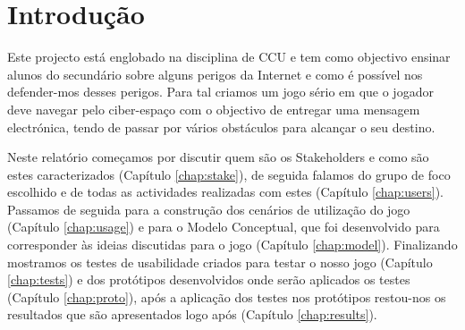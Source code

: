 \chapter{Introdução}
\label{chap:intro} 

Este projecto está englobado na disciplina de \ac{CCU} e tem como objectivo ensinar alunos do secundário sobre alguns perigos da Internet e como é possível nos defender-mos desses perigos.
Para tal criamos um jogo sério em que o jogador deve navegar pelo ciber-espaço com o objectivo de entregar uma mensagem electrónica, tendo de passar por vários obstáculos para alcançar o seu destino.

Neste relatório começamos por discutir quem são os Stakeholders e como são estes caracterizados (Capítulo \ref{chap:stake}), de seguida falamos do grupo de foco escolhido e de todas as actividades realizadas com estes (Capítulo \ref{chap:users}).
Passamos de seguida para a construção dos cenários de utilização do jogo (Capítulo \ref{chap:usage}) e para o Modelo Conceptual, que foi desenvolvido para corresponder às ideias discutidas para o jogo (Capítulo \ref{chap:model}).
Finalizando mostramos os testes de usabilidade criados para testar o nosso jogo (Capítulo \ref{chap:tests}) e dos protótipos desenvolvidos onde serão aplicados os testes (Capítulo \ref{chap:proto}), após a aplicação dos testes nos protótipos restou-nos os resultados que são apresentados logo após (Capítulo \ref{chap:results}).
